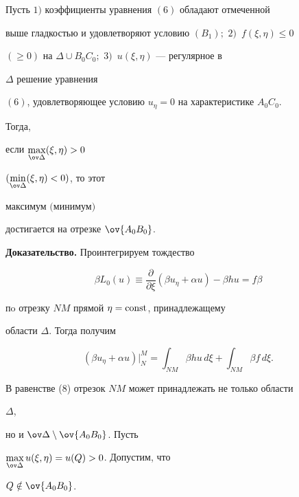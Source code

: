  


\begin{lem} 


Пусть $1)$ коэффициенты уравнения $(6)$ обладают отмеченной 


выше гладкостью и удовлетворяют условию $(B_1);$ $2)$~$f(\xi,\eta)\le0$ 


$(\ge0)$ на $\Delta\cup B_0C_0;$ $3)$~$u(\xi,\eta)$ --- регулярное в 


$\Delta$ решение уравнения 


$(6)$, удовлетворяющее условию $u_\eta=0$ на характеристике $A_0C_0$. 


Тогда, 


если $\max\limits_{\ov\Delta}(\xi,\eta)>0$


$(\min\limits_{\ov\Delta}(\xi,\eta)<0)$, то этот 


максимум $($минимум$)$ 


достигается на отрезке $\ov{A_0B_0}$. 


\end{lem} 


 


{\bf Доказательство.} Проинтегрируем тождество 


\begin{equation} 


\beta L_0(u)\equiv\frac{\partial}{\partial\xi} 


(\beta u_\eta+\alpha u)-\beta h u=f\beta 


\end{equation} 


пo отрезку $N M$ прямой $\eta=\operatorname{const}$, принадлежащему 


области $\Delta$. Тогда получим 


\begin{equation} 


(\beta u_\eta+\alpha u)\big|^M_N=\int_{N M}\beta h u\,d\xi+ 


\int_{N M}\beta f\,d\xi. 


\end{equation} 


В равенстве (8) отрезок $N M$ может принадлежать не только области 


$\Delta$, 


но и $\ov\Delta\setminus\ov{A_0B_0}$. Пусть 


$\max\limits_{\ov\Delta}u(\xi,\eta)=u(Q)>0$. Допустим, что 


$Q\notin\ov{A_0B_0}$. 


